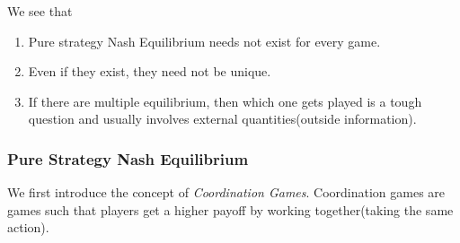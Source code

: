 \begin{remark}
	We see that
	\begin{enumerate}
		\item Pure strategy Nash Equilibrium needs not exist for every game.
		\item Even if they exist, they need not be unique.
		\item If there are multiple equilibrium, then which one gets played is a tough question and usually involves external quantities(outside information).
	\end{enumerate}
\end{remark}

\subsubsection{Pure Strategy Nash Equilibrium}
We first introduce the concept of \emph{Coordination Games}. Coordination games are games such that players get a higher payoff by working together(taking the same action).

